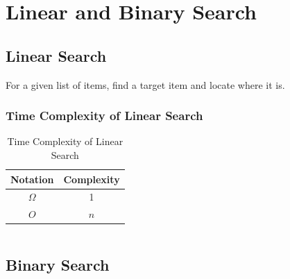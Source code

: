 \chapter{Linear and Binary Search}
\label{chap:linear-and-binary-search}

\section{Linear Search}
\label{sec:linear-search}

\begin{problem}
  For a given list of items, find a target item 
  and locate where it is.
\end{problem}

\begin{algorithm}
  \caption{Linear Search Algorithm}
  \label{linear-search-algorithm}
\end{algorithm}

\subsection{Time Complexity of Linear Search}
\label{ssec:time-complexity-of-linear-search}
\begin{table}[htbp]
  \centering
  \begin{tabular}{|c|c|}
    \hline
    Notation&Complexity\\
    \hline
    \(\Omega\)&1\\
    \(O\)&\(n\)\\
    \hline
  \end{tabular}
  \caption{Time Complexity of Linear Search}
  \label{tab:time-complexity-of-linear-search}
\end{table}

\begin{listing}[htbp]
  \inputminted{python}{Code/linear_search.py}
  \caption{Linear Search Implementation}
  \label{linear-search-implementation}
\end{listing}

\section{Binary Search}
\label{sec:binary-search}

